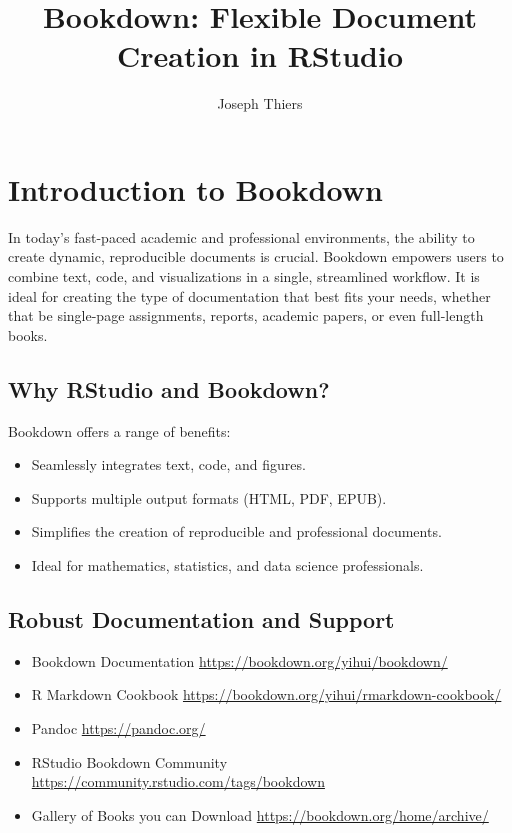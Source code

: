\documentclass[
]{book}
\title{Bookdown: Flexible Document Creation in RStudio}
\author{Joseph Thiers}
\date{}
\theoremstyle{definition}
\theoremstyle{definition}
\theoremstyle{definition}
\theoremstyle{definition}
\theoremstyle{remark}
\begin{document}
\maketitle

{
\setcounter{tocdepth}{1}
\tableofcontents
}
\chapter{Introduction to Bookdown}\label{introduction}

In today's fast-paced academic and professional environments, the ability to create dynamic, reproducible documents is crucial. Bookdown empowers users to combine text, code, and visualizations in a single, streamlined workflow. It is ideal for creating the type of documentation that best fits your needs, whether that be single-page assignments, reports, academic papers, or even full-length books.

\section{Why RStudio and Bookdown?}\label{why-rstudio-and-bookdown}

Bookdown offers a range of benefits:

\begin{itemize}
\item
  Seamlessly integrates text, code, and figures.
\item
  Supports multiple output formats (HTML, PDF, EPUB).
\item
  Simplifies the creation of reproducible and professional documents.
\item
  Ideal for mathematics, statistics, and data science professionals.
\end{itemize}

\section{Robust Documentation and Support}\label{robust-documentation-and-support}

\begin{itemize}
\item
  Bookdown Documentation \url{https://bookdown.org/yihui/bookdown/}
\item
  R Markdown Cookbook \url{https://bookdown.org/yihui/rmarkdown-cookbook/}
\item
  Pandoc \url{https://pandoc.org/}
\item
  RStudio Bookdown Community \url{https://community.rstudio.com/tags/bookdown}
\item
  Gallery of Books you can Download \url{https://bookdown.org/home/archive/}
\end{itemize}
\end{document}
